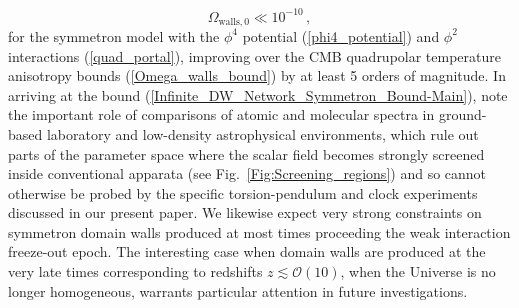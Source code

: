 \documentclass[aps,prd,onecolumn,nofootinbib]{revtex4-2} %
\begin{document}
\begin{equation}
\label{Infinite_DW_Network_Symmetron_Bound-Main}
\Omega_{\textrm{walls},0} \ll 10^{-10}  \, , 
\end{equation}
for the symmetron model with the $\phi^4$ potential (\ref{phi4_potential}) and $\phi^2$ interactions (\ref{quad_portal}), improving over the CMB quadrupolar temperature anisotropy bounds (\ref{Omega_walls_bound}) by at least 5 orders of magnitude. 
In arriving at the bound (\ref{Infinite_DW_Network_Symmetron_Bound-Main}), note the important role of comparisons of atomic and molecular spectra in ground-based laboratory and low-density astrophysical environments, which rule out parts of the parameter space where the scalar field becomes strongly screened inside conventional apparata (see Fig.~\ref{Fig:Screening_regions}) and so cannot otherwise be probed by the specific torsion-pendulum and clock experiments discussed in our present paper. 
We likewise expect very strong constraints on symmetron domain walls produced at most times proceeding the weak interaction freeze-out epoch. 
The interesting case when domain walls are produced at the very late times corresponding to redshifts $z \lesssim \mathcal{O} (10)$, when the Universe is no longer homogeneous, warrants particular attention in future investigations. 
\end{document}

